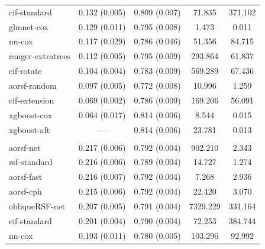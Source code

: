 \documentclass{article}\usepackage[]{graphicx}\usepackage[]{xcolor}
\newenvironment{knitrout}{}{} %
\begin{document}
\begin{knitrout}
\begin{longtable}[t]{lcccc}
\hspace{1em}cif-standard & 0.132 (0.005) & 0.809 (0.007) & 71.835 & 371.102\\
\hspace{1em}glmnet-cox & 0.129 (0.011) & 0.795 (0.008) & 1.473 & 0.011\\
\hspace{1em}nn-cox & 0.117 (0.029) & 0.786 (0.046) & 51.356 & 84.715\\
\hspace{1em}ranger-extratrees & 0.112 (0.005) & 0.795 (0.009) & 293.864 & 61.837\\
\hspace{1em}cif-rotate & 0.104 (0.004) & 0.783 (0.009) & 569.289 & 67.436\\
\hspace{1em}aorsf-random & 0.097 (0.005) & 0.772 (0.008) & 10.996 & 1.259\\
\hspace{1em}cif-extension & 0.069 (0.002) & 0.786 (0.009) & 169.206 & 56.091\\
\hspace{1em}xgboost-cox & 0.064 (0.017) & 0.814 (0.006) & 8.544 & 0.015\\
\hspace{1em}xgboost-aft & --- & 0.814 (0.006) & 23.781 & 0.013\\
\addlinespace[0.3em]
\multicolumn{5}{l}{\textit{\textbf{ARIC; death, n = 13623, p = 41}}}\\
\hline
\hspace{1em}aorsf-net & 0.217 (0.006) & 0.792 (0.004) & 902.210 & 2.343\\
\hspace{1em}rsf-standard & 0.216 (0.006) & 0.789 (0.004) & 14.727 & 1.274\\
\hspace{1em}aorsf-fast & 0.216 (0.007) & 0.792 (0.004) & 7.268 & 2.936\\
\hspace{1em}aorsf-cph & 0.215 (0.006) & 0.792 (0.004) & 22.420 & 3.070\\
\hspace{1em}obliqueRSF-net & 0.207 (0.005) & 0.791 (0.004) & 7329.229 & 331.164\\
\hspace{1em}cif-standard & 0.201 (0.004) & 0.790 (0.004) & 72.253 & 384.744\\
\hspace{1em}nn-cox & 0.193 (0.011) & 0.780 (0.005) & 103.296 & 92.992\\

\end{longtable}
\end{knitrout}
\end{document}
